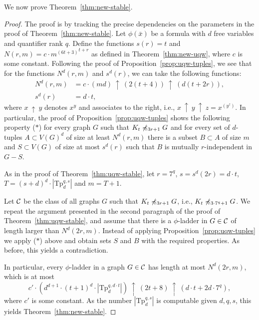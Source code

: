 We now prove Theorem~\ref{thm:new-stable}.
\begin{proof}
	The proof is by tracking the precise dependencies on the parameters in the proof of Theorem~\ref{thm:new-stable}. 
	Let $\phi(\bar x)$ be a formula with $d$ free variables and quantifier rank $q$.
 Define the functions
	$s(r)=t$ and $N(r,m)=c\cdot {m^{(6t+3)}}^{t+r}$ as defined in Theorem~\ref{thm:new-uqw},
	where $c$ is some constant. 
	Following the proof of Proposition~\ref{prop:uqw-tuples}, we see that for the functions $N^d(r,m)$ and $s^d(r)$, we can take the following functions:%
		\newcommand{\pow}{\ \uparrow\ }%
	\begin{align*}
	 N^d(r,m)&= c\cdot (m d)\pow(2(t+4))\pow(d(t+2r)),\\
	  s^d(r)&= d\cdot t,
	\end{align*}
where $x\pow y$ denotes $x^y$ and associates to the right, i.e., $x\pow y\pow z=x^(y^z)$.
In particular, the proof of Proposition~\ref{prop:uqw-tuples} shows the following property
($\ast$)
for every graph $G$ such that $K_t\not\minor_{3r+1} G$ 
and for every set of $d$-tuples $A\subset V(G)^d$ of size at least $N^d(r,m)$
there is a subset $B\subset A$ of size $m$ and $S\subset V(G)$ of size at most $s^d(r)$
such that $B$ is mutually $r$-independent in $G-S$.

	
As in the proof of Theorem~\ref{thm:uqw-stable}, let $r=7^q$,  
$s=s^d(2r)=d\cdot t$,  $T=(s+d)^d\cdot |\mathrm{Tp}_d^{q,s}|$ and $m=T+1$.



Let $\cal C$ be the class of all graphs $G$
such that $K_t\not\minor_{3r+1} G$, i.e., $K_t\not\minor_{3\cdot 7^q+1} G$. We repeat the argument presented in the second paragraph of the proof of Theorem~\ref{thm:uqw-stable}, and assume that there is a $\phi$-ladder in $G\in \cal C$ of length larger than $N^d(2r,m)$.
 Instead of applying Proposition~\ref{prop:uqw-tuples} we apply  ($\ast$) above
and obtain sets  $S$ and $B$ with the required properties. As before, this yields a contradiction. 


In particular, every $\phi$-ladder in a graph $G\in \cal C$ has length at most $N^d(2r,m)$, 
which is at most $$c'\cdot (d^{d+1}\cdot (t+1)^d\cdot |\mathrm{Tp}_d^{q,d\cdot t}|)\pow(2t+8)\pow(d\cdot t+2d\cdot 7^q),$$
where $c'$ is some constant.
As the number $|\mathrm{Tp}_d^{q,s}|$ is computable given $d,q,s$, this 
 yields Theorem~\ref{thm:new-stable}.
\end{proof}
